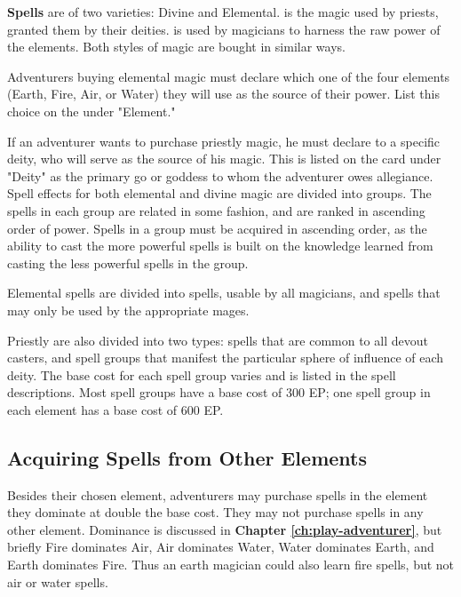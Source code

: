 \begin{multicols*}{2}
\textbf{Spells} are of two varieties: Divine and Elemental.  is the magic used by priests, granted them by their deities.  is used by magicians to harness the raw power of the elements. Both styles of magic are bought in similar ways.

Adventurers buying elemental magic must declare which one of the four elements (Earth, Fire, Air, or Water) they will use as the source of their power. List this choice on the  under "Element."

If an adventurer wants to purchase priestly magic, he must declare  to a specific deity, who will serve as the source of his magic. This is listed on the card under "Deity" as the primary go or goddess to whom the adventurer owes allegiance.
Spell effects for both elemental and divine magic are divided into groups. The spells in each group are related in some fashion, and are ranked in ascending order of power.
Spells in a group must be acquired in ascending order, as the ability to cast the more powerful spells is built on the knowledge learned from casting the less powerful spells in the group.

Elemental spells are divided into  spells, usable by all magicians, and  spells that may only be used by the appropriate mages.

Priestly  are also divided into two types:  spells that are common to all devout casters, and  spell groups that manifest the particular sphere of influence of each deity.
The base cost for each spell group varies and is listed in the spell descriptions. Most spell groups have a base cost of 300 EP; one spell group in each element has a base
cost of 600 EP.
\subsection{Acquiring Spells from Other Elements}
Besides their chosen element, adventurers may purchase spells in the element they dominate at double the base cost. They may not purchase spells in any other element.
Dominance is discussed in \textbf{Chapter \ref{ch:play-adventurer}}, but briefly Fire dominates Air, Air dominates Water, Water dominates Earth, and Earth dominates Fire. Thus an earth magician could also learn fire spells, but not air or water spells.

\end{multicols*}
